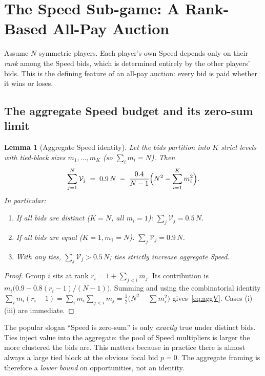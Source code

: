 \documentclass[11pt,a4paper]{article}
\newtheorem{lemma}[proposition]{Lemma}
\theoremstyle{definition}
\theoremstyle{remark}
\newcommand{\Sp}{\mathcal{V}}
\begin{document}
\section{The Speed Sub-game: A Rank-Based All-Pay Auction}
\label{sec:speed}

Assume \(N\) symmetric players. Each player's own Speed depends only on their
\emph{rank} among the Speed bids, which is determined entirely by the other
players' bids. This is the defining feature of an all-pay auction: every bid
is paid whether it wins or loses.

\subsection{The aggregate Speed budget and its zero-sum limit}

\begin{lemma}[Aggregate Speed identity]\label{lem:aggV}
Let the bids partition into \(K\) strict levels with tied-block sizes
\(m_1,\ldots,m_K\) (so \(\sum_i m_i=N\)). Then
\begin{equation}\label{eq:aggV}
\sum_{j=1}^{N}\Sp_j \;=\; 0.9\,N \;-\; \frac{0.4}{N-1}\Bigl(N^2-\sum_{i=1}^{K}m_i^2\Bigr).
\end{equation}
In particular:
\begin{enumerate}[leftmargin=*,itemsep=1pt]
\item[\textnormal{(i)}] If all bids are distinct (\(K=N\), all \(m_i=1\)):
\(\sum_j\Sp_j = 0.5\,N\).
\item[\textnormal{(ii)}] If all bids are equal (\(K=1,m_1=N\)):
\(\sum_j\Sp_j = 0.9\,N\).
\item[\textnormal{(iii)}] With any ties, \(\sum_j\Sp_j > 0.5\,N\); ties
strictly increase aggregate Speed.
\end{enumerate}
\end{lemma}

\begin{proof}
Group \(i\) sits at rank \(r_i=1+\sum_{j<i}m_j\). Its contribution is
\(m_i\bigl(0.9-0.8(r_i-1)/(N-1)\bigr)\). Summing and using the
combinatorial identity
\(\sum_i m_i(r_i-1)=\sum_i m_i\sum_{j<i}m_j=\tfrac{1}{2}\!\bigl(N^2-\sum m_i^2\bigr)\)
gives~\eqref{eq:aggV}. Cases (i)--(iii) are immediate.
\end{proof}

\begin{warnbox}
The popular slogan ``Speed is zero-sum'' is only \emph{exactly} true under
distinct bids. Ties inject value into the aggregate: the pool of Speed
multipliers is larger the more clustered the bids are. This matters because in
practice there is almost always a large tied block at the obvious focal bid
\(p=0\). The aggregate framing is therefore a \emph{lower bound} on opportunities,
not an identity.
\end{warnbox}
\end{document}
